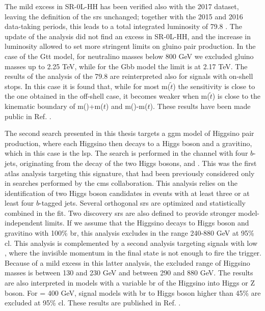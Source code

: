 The mild excess in SR-0L-HH has been verified also with the 2017 dataset,
leaving the definition of the \glspl{sr} unchanged; 
together with the 2015 and 2016 data-taking periods, this leads to a total integrated luminosity 
of 79.8 \ifb. 
The update of the analysis did not find an excess in SR-0L-HH, and the increase in luminosity 
allowed to set more stringent limits on gluino pair production. 
In the case of the Gtt model, for neutralino masses below 800 GeV we excluded gluino masses up to 
2.25 TeV, while for the Gbb model the limit is at 2.17 TeV. 
The results of the analysis of the 79.8 \ifb are reinterpreted also for signals with on-shell 
stops. In this case it is found that, while for most m($\tilde{t}$) the sensitivity 
is close to the one obtained in the off-shell case, it becomes weaker 
when m($\tilde{t}$) is close to the kinematic boundary of 
m(\ninoone)+m($t$) and m(\gluino)-m($t$).  
These results have been made public in Ref. \cite{ATLAS-CONF-2018-041}.


The second search presented in this thesis targets a \gls{ggm} model of Higgsino pair production, 
where each Higgsino then decays to a Higgs boson and 
a gravitino, which in this case is the \gls{lsp}. The search is performed in the channel with four $b$-jets, originating from 
the decay of the two Higgs bosons, and \met. 
This was the first \gls{atlas} analysis targeting this signature, that had been 
previously considered only in searches performed by the \gls{cms} collaboration.
This analysis relies on the identification of two Higgs boson candidates in events with at least three or 
at least four $b$-tagged jets. Several orthogonal \glspl{sr} are optimized and statistically combined in the fit. 
Two discovery \glspl{sr} are also defined to provide stronger model-independent limits. 
If we assume that the Higgsino decays to Higgs boson and gravitino with 100\% \gls{br}, 
this analysis excludes \mhino in the range 240-880 GeV at 95\% \gls{cl}. 
This analysis is complemented by a second analysis targeting signals with low \mhino, where the 
invisible momentum in the final state is not enough to fire the \met trigger. 
Because of a mild excess in this latter analysis, the excluded range of Higgsino masses is 
between 130 and 230 GeV and between 290 and 880 GeV.
The results are also interpreted in models with a variable \gls{br} of the Higgsino into Higgs or Z boson. 
For \mhino = 400 GeV, signal models with \gls{br} to Higgs boson higher than 45\% are 
excluded at 95\% \gls{cl}.
These results are published in Ref. \cite{Aaboud:2018htj}. 

